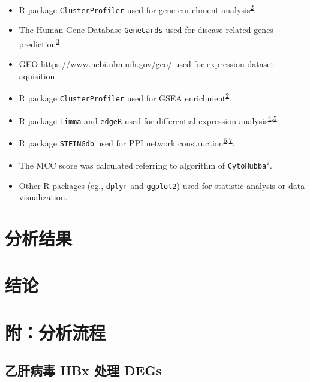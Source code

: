 \documentclass[
]{article}
\providecommand{\tightlist}{%
  \setlength{\itemsep}{0pt}\setlength{\parskip}{0pt}}
\begin{document}
\begin{itemize}
\tightlist
\item
  R package \texttt{ClusterProfiler} used for gene enrichment analysis\textsuperscript{\protect\hyperlink{ref-ClusterprofilerWuTi2021}{2}}.
\item
  The Human Gene Database \texttt{GeneCards} used for disease related genes prediction\textsuperscript{\protect\hyperlink{ref-TheGenecardsSStelze2016}{3}}.
\item
  GEO \url{https://www.ncbi.nlm.nih.gov/geo/} used for expression dataset aquisition.
\item
  R package \texttt{ClusterProfiler} used for GSEA enrichment\textsuperscript{\protect\hyperlink{ref-ClusterprofilerWuTi2021}{2}}.
\item
  R package \texttt{Limma} and \texttt{edgeR} used for differential expression analysis\textsuperscript{\protect\hyperlink{ref-LimmaPowersDiRitchi2015}{4},\protect\hyperlink{ref-EdgerDifferenChen}{5}}.
\item
  R package \texttt{STEINGdb} used for PPI network construction\textsuperscript{\protect\hyperlink{ref-TheStringDataSzklar2021}{6},\protect\hyperlink{ref-CytohubbaIdenChin2014}{7}}.
\item
  The MCC score was calculated referring to algorithm of \texttt{CytoHubba}\textsuperscript{\protect\hyperlink{ref-CytohubbaIdenChin2014}{7}}.
\item
  Other R packages (eg., \texttt{dplyr} and \texttt{ggplot2}) used for statistic analysis or data visualization.
\end{itemize}

\hypertarget{results}{%
\section{分析结果}\label{results}}

\hypertarget{dis}{%
\section{结论}\label{dis}}

\hypertarget{workflow}{%
\section{附：分析流程}\label{workflow}}

\hypertarget{ux4e59ux809dux75c5ux6bd2-hbx-ux5904ux7406-degs}{%
\subsection{乙肝病毒 HBx 处理 DEGs}\label{ux4e59ux809dux75c5ux6bd2-hbx-ux5904ux7406-degs}}
\end{document}
